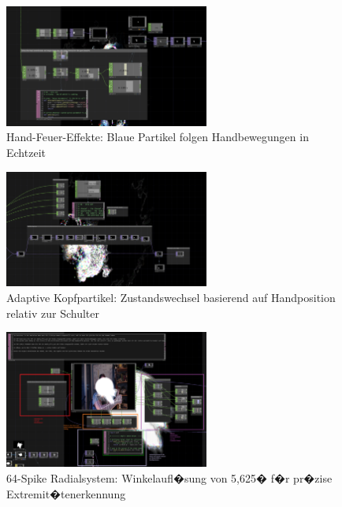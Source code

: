 \begin{figure}[!htbp]
    \centering
    \includegraphics[width=0.6\textwidth,height=0.25\textheight,keepaspectratio]{images/docupictures/NoisyBlob_HEAD_to_ParticleGPU_Translate.png}
    \caption{Hand-Feuer-Effekte: Blaue Partikel folgen Handbewegungen in Echtzeit}
    \label{fig:particle_hands}
\end{figure}

\begin{figure}[!htbp]
    \centering
    \includegraphics[width=0.6\textwidth,height=0.25\textheight,keepaspectratio]{images/docupictures/NoisyBlob_animatedSwitchzwischenBlitzUndNichtBlitzBeiTrackingTrigger.png}
    \caption{Adaptive Kopfpartikel: Zustandswechsel basierend auf Handposition relativ zur Schulter}
    \label{fig:relative_switch}
\end{figure}

\begin{figure}[!htbp]
    \centering
    \includegraphics[width=0.6\textwidth,height=0.25\textheight,keepaspectratio]{images/docupictures/TopDown_KreisZuRampsParametisierteBerechnungen.png}
    \caption{64-Spike Radialsystem: Winkelaufl�sung von 5,625� f�r pr�zise Extremit�tenerkennung}
    \label{fig:spike_system}
\end{figure}

